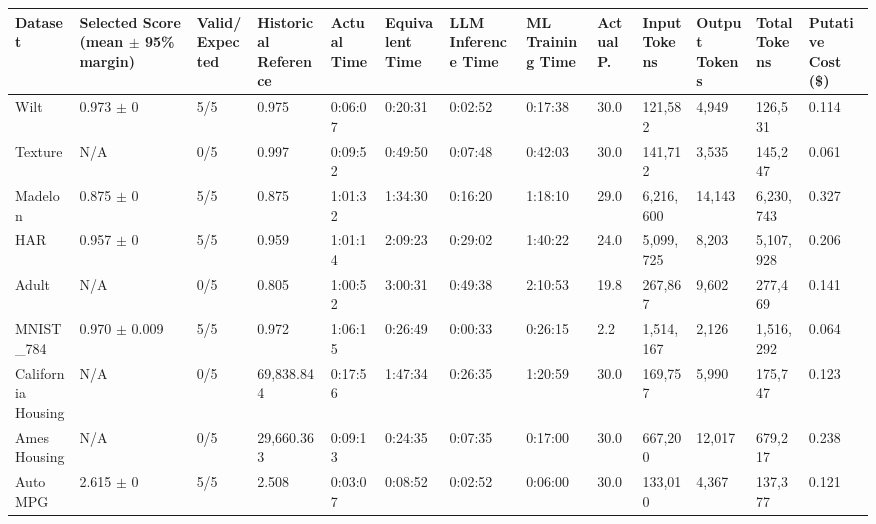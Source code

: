 \begin{tabular}{lllllllllllll}
\hline
Dataset & Selected Score (mean \ensuremath{\pm} 95\% margin) & Valid/Expected & Historical Reference & Actual Time & Equivalent Time & LLM Inference Time & ML Training Time & Actual P. & Input Tokens & Output Tokens & Total Tokens & Putative Cost (\$) \\
\hline
Wilt & 0.973 \ensuremath{\pm} 0 & 5/5 & 0.975 & 0:06:07 & 0:20:31 & 0:02:52 & 0:17:38 & 30.0 & 121,582 & 4,949 & 126,531 & 0.114 \\
Texture & N/A & 0/5 & 0.997 & 0:09:52 & 0:49:50 & 0:07:48 & 0:42:03 & 30.0 & 141,712 & 3,535 & 145,247 & 0.061 \\
Madelon & 0.875 \ensuremath{\pm} 0 & 5/5 & 0.875 & 1:01:32 & 1:34:30 & 0:16:20 & 1:18:10 & 29.0 & 6,216,600 & 14,143 & 6,230,743 & 0.327 \\
HAR & 0.957 \ensuremath{\pm} 0 & 5/5 & 0.959 & 1:01:14 & 2:09:23 & 0:29:02 & 1:40:22 & 24.0 & 5,099,725 & 8,203 & 5,107,928 & 0.206 \\
Adult & N/A & 0/5 & 0.805 & 1:00:52 & 3:00:31 & 0:49:38 & 2:10:53 & 19.8 & 267,867 & 9,602 & 277,469 & 0.141 \\
MNIST\_784 & 0.970 \ensuremath{\pm} 0.009 & 5/5 & 0.972 & 1:06:15 & 0:26:49 & 0:00:33 & 0:26:15 & 2.2 & 1,514,167 & 2,126 & 1,516,292 & 0.064 \\
California Housing & N/A & 0/5 & 69,838.844 & 0:17:56 & 1:47:34 & 0:26:35 & 1:20:59 & 30.0 & 169,757 & 5,990 & 175,747 & 0.123 \\
Ames Housing & N/A & 0/5 & 29,660.363 & 0:09:13 & 0:24:35 & 0:07:35 & 0:17:00 & 30.0 & 667,200 & 12,017 & 679,217 & 0.238 \\
Auto MPG & 2.615 \ensuremath{\pm} 0 & 5/5 & 2.508 & 0:03:07 & 0:08:52 & 0:02:52 & 0:06:00 & 30.0 & 133,010 & 4,367 & 137,377 & 0.121 \\
\hline
\end{tabular}
